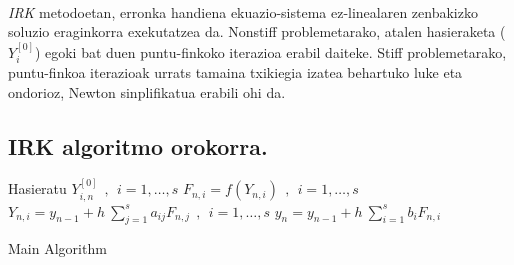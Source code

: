 \paragraph*{}\emph{IRK} metodoetan, erronka handiena ekuazio-sistema ez-linealaren zenbakizko soluzio eraginkorra exekutatzea da. Nonstiff problemetarako, atalen hasieraketa ($Y_i^{[0]}$) egoki bat duen puntu-finkoko iterazioa erabil daiteke. Stiff problemetarako, puntu-finkoa iterazioak urrats tamaina txikiegia izatea behartuko luke eta ondorioz, Newton sinplifikatua erabili ohi da.         

\subsection*{IRK algoritmo orokorra.}


\begin{algorithm}[H]
 \BlankLine
  {
   \BlankLine
   Hasieratu  $Y_{i,n}^{[0]} \ \ , \ \ i=1,\dots,s $\;
    \BlankLine
   {
    \BlankLine 
    $F_{n,i}=f(Y_{n,i}) \ \ , \ \  i=1,\dots,s$\;
    $Y_{n,i}=y_{n-1}+ h \ \sum\limits_{j=1}^{s} a_{ij} F_{n,j}  \ \ , \ \  i=1,\dots,s$\;  
   }
   \BlankLine
    $y_{n}=y_{n-1}+ h \ \sum\limits_{i=1}^{s} b_i F_{n,i} $\;
   \BlankLine
 }
 \caption{Main Algorithm}
\end{algorithm}

